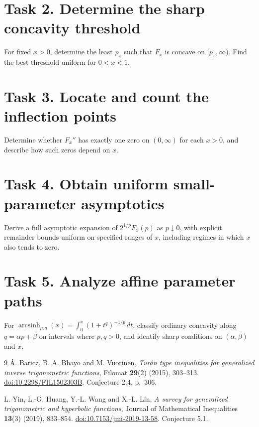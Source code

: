 \documentclass[11pt]{article}
\begin{document}
\section*{Task 2. Determine the sharp concavity threshold}
For fixed $x>0$, determine the least $p_x$ such that $F_x$ is concave
on $[p_x,\infty)$. Find the best threshold uniform for $0<x<1$.

\section*{Task 3. Locate and count the inflection points}
Determine whether $F_x''$ has exactly one zero on $(0,\infty)$ for
each $x>0$, and describe how such zeros depend on $x$.

\section*{Task 4. Obtain uniform small-parameter asymptotics}
Derive a full asymptotic expansion of $2^{1/p}F_x(p)$ as $p\downarrow0$,
with explicit remainder bounds uniform on specified ranges of $x$,
including regimes in which $x$ also tends to zero.

\section*{Task 5. Analyze affine parameter paths}
For $\operatorname{arcsinh}_{p,q}(x)=
\int_0^x(1+t^q)^{-1/p}\,dt$, classify ordinary concavity along
$q=\alpha p+\beta$ on intervals where $p,q>0$, and identify sharp
conditions on $(\alpha,\beta)$ and $x$.

\begin{thebibliography}{9}
\'A. Baricz, B. A. Bhayo and M. Vuorinen,
\emph{Tur\'an type inequalities for generalized inverse trigonometric functions},
Filomat \textbf{29}(2) (2015), 303--313.
\href{https://doi.org/10.2298/FIL1502303B}{doi:10.2298/FIL1502303B}.
Conjecture 2.4, p.~306.

L. Yin, L.-G. Huang, Y.-L. Wang and X.-L. Lin,
\emph{A survey for generalized trigonometric and hyperbolic functions},
Journal of Mathematical Inequalities \textbf{13}(3) (2019), 833--854.
\href{https://doi.org/10.7153/jmi-2019-13-58}{doi:10.7153/jmi-2019-13-58}.
Conjecture 5.1.
\end{thebibliography}
\end{document}
